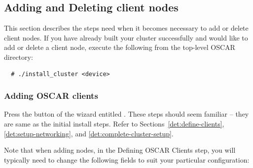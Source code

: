 

\subsection{Adding and Deleting client nodes}

This section describes the steps need when it becomes necessary to add
or delete client nodes. If you have already built your cluster
successfully and would like to add or delete a client node, execute
the following from the top-level OSCAR directory:

\begin{verbatim}
  # ./install_cluster <device>
\end{verbatim}



\subsubsection{Adding OSCAR clients}
\label{det:adding-clients}

Press the button of the wizard entitled .
 These steps should seem
familiar -- they are same as the initial install steps.  Refer to
Sections~\ref{det:define-clients}, \ref{det:setup-networking}, and
\ref{det:complete-cluster-setup}.

Note that when adding nodes, in the Defining OSCAR Clients step, you
will typically need to change the following fields to suit your
particular configuration:

